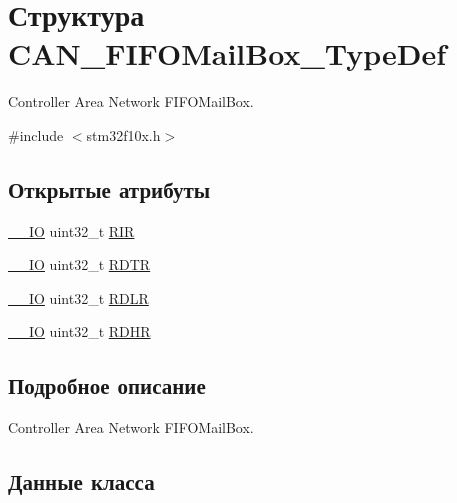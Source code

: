 \hypertarget{struct_c_a_n___f_i_f_o_mail_box___type_def}{}\section{Структура C\+A\+N\+\_\+\+F\+I\+F\+O\+Mail\+Box\+\_\+\+Type\+Def}
\label{struct_c_a_n___f_i_f_o_mail_box___type_def}


Controller Area Network F\+I\+F\+O\+Mail\+Box.  




{\ttfamily \#include $<$stm32f10x.\+h$>$}

\subsection*{Открытые атрибуты}
\begin{DoxyCompactItemize}
\item 
\mbox{\hyperlink{group___c_m_s_i_s___c_m3__core__definitions_gaec43007d9998a0a0e01faede4133d6be}{\+\_\+\+\_\+\+IO}} uint32\+\_\+t \mbox{\hyperlink{struct_c_a_n___f_i_f_o_mail_box___type_def_a034504d43f7b16b320745a25b3a8f12d}{R\+IR}}
\item 
\mbox{\hyperlink{group___c_m_s_i_s___c_m3__core__definitions_gaec43007d9998a0a0e01faede4133d6be}{\+\_\+\+\_\+\+IO}} uint32\+\_\+t \mbox{\hyperlink{struct_c_a_n___f_i_f_o_mail_box___type_def_a49d74ca8b402c2b9596bfcbe4cd051a9}{R\+D\+TR}}
\item 
\mbox{\hyperlink{group___c_m_s_i_s___c_m3__core__definitions_gaec43007d9998a0a0e01faede4133d6be}{\+\_\+\+\_\+\+IO}} uint32\+\_\+t \mbox{\hyperlink{struct_c_a_n___f_i_f_o_mail_box___type_def_ac7d62861de29d0b4fcf11fabbdbd76e7}{R\+D\+LR}}
\item 
\mbox{\hyperlink{group___c_m_s_i_s___c_m3__core__definitions_gaec43007d9998a0a0e01faede4133d6be}{\+\_\+\+\_\+\+IO}} uint32\+\_\+t \mbox{\hyperlink{struct_c_a_n___f_i_f_o_mail_box___type_def_a95890984bd67845015d40e82fb091c93}{R\+D\+HR}}
\end{DoxyCompactItemize}


\subsection{Подробное описание}
Controller Area Network F\+I\+F\+O\+Mail\+Box. 

\subsection{Данные класса}
\mbox{\label{struct_c_a_n___f_i_f_o_mail_box___type_def_a95890984bd67845015d40e82fb091c93}} 
